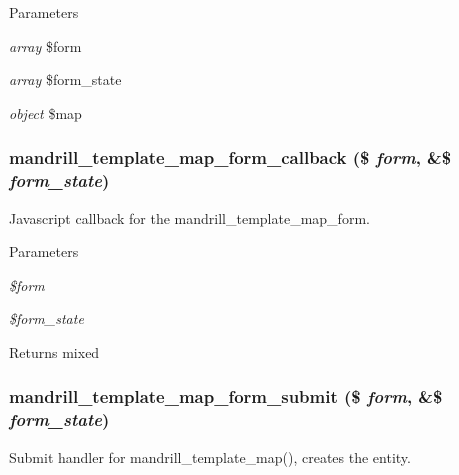 \begin{DoxyParams}{Parameters}
\item[{\em array}]\$form \item[{\em array}]\$form\_\-state \item[{\em object}]\$map \end{DoxyParams}
\hypertarget{mandrill__template_8admin_8inc_a81e130e132ad33ff656653ae6b93fe0f}{
\subsubsection[{mandrill\_\-template\_\-map\_\-form\_\-callback}]{\setlength{\rightskip}{0pt plus 5cm}mandrill\_\-template\_\-map\_\-form\_\-callback (\$ {\em form}, \/  \&\$ {\em form\_\-state})}}
\label{mandrill__template_8admin_8inc_a81e130e132ad33ff656653ae6b93fe0f}
Javascript callback for the mandrill\_\-template\_\-map\_\-form.


\begin{DoxyParams}{Parameters}
\item[{\em \$form}]\item[{\em \$form\_\-state}]\end{DoxyParams}
\begin{DoxyReturn}{Returns}
mixed 
\end{DoxyReturn}
\hypertarget{mandrill__template_8admin_8inc_aae04ec915ad905ac6c39679e543eff56}{
\subsubsection[{mandrill\_\-template\_\-map\_\-form\_\-submit}]{\setlength{\rightskip}{0pt plus 5cm}mandrill\_\-template\_\-map\_\-form\_\-submit (\$ {\em form}, \/  \&\$ {\em form\_\-state})}}
\label{mandrill__template_8admin_8inc_aae04ec915ad905ac6c39679e543eff56}
Submit handler for mandrill\_\-template\_\-map(), creates the entity.


